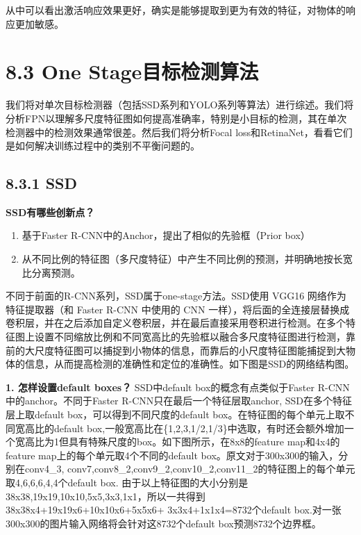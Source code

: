从中可以看出激活响应效果更好，确实是能够提取到更为有效的特征，对物体的响应更加敏感。

\section{8.3 One
Stage目标检测算法}\label{one-stageux76eeux6807ux68c0ux6d4bux7b97ux6cd5}

我们将对单次目标检测器（包括SSD系列和YOLO系列等算法）进行综述。我们将分析FPN以理解多尺度特征图如何提高准确率，特别是小目标的检测，其在单次检测器中的检测效果通常很差。然后我们将分析Focal
loss和RetinaNet，看看它们是如何解决训练过程中的类别不平衡问题的。

\subsection{8.3.1 SSD}\label{ssd}

\textbf{SSD有哪些创新点？}

\begin{enumerate}
\def\labelenumi{\arabic{enumi}.}
\item
  基于Faster R-CNN中的Anchor，提出了相似的先验框（Prior box）
\item
  从不同比例的特征图（多尺度特征）中产生不同比例的预测，并明确地按长宽比分离预测。
\end{enumerate}

不同于前面的R-CNN系列，SSD属于one-stage方法。SSD使用 VGG16
网络作为特征提取器（和 Faster R-CNN 中使用的 CNN
一样），将后面的全连接层替换成卷积层，并在之后添加自定义卷积层，并在最后直接采用卷积进行检测。在多个特征图上设置不同缩放比例和不同宽高比的先验框以融合多尺度特征图进行检测，靠前的大尺度特征图可以捕捉到小物体的信息，而靠后的小尺度特征图能捕捉到大物体的信息，从而提高检测的准确性和定位的准确性。如下图是SSD的网络结构图。

\begin{figure}
\centering
\caption{}
\end{figure}

\textbf{1. 怎样设置default boxes？} SSD中default
box的概念有点类似于Faster R-CNN中的anchor。不同于Faster
R-CNN只在最后一个特征层取anchor, SSD在多个特征层上取default
box，可以得到不同尺度的default
box。在特征图的每个单元上取不同宽高比的default
box,一般宽高比在\{1,2,3,1/2,1/3\}中选取，有时还会额外增加一个宽高比为1但具有特殊尺度的box。如下图所示，在8x8的feature
map和4x4的feature map上的每个单元取4个不同的default
box。原文对于300x300的输入，分别在conv4\_3,
conv7,conv8\_2,conv9\_2,conv10\_2,conv11\_2的特征图上的每个单元取4,6,6,6,4,4个default
box.
由于以上特征图的大小分别是38x38,19x19,10x10,5x5,3x3,1x1，所以一共得到38x38x4+19x19x6+10x10x6+5x5x6+
3x3x4+1x1x4=8732个default
box.对一张300x300的图片输入网络将会针对这8732个default
box预测8732个边界框。


